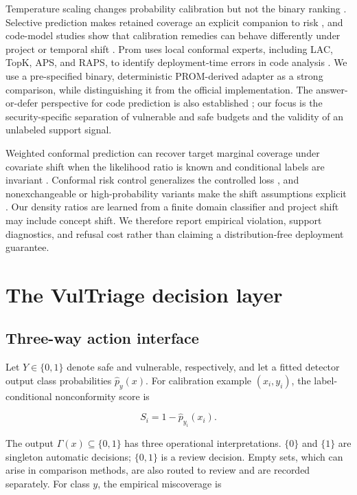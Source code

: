 \documentclass[preprint,12pt]{elsarticle}
\begin{document}
Temperature scaling changes probability calibration but not the binary ranking \cite{guo2017calibration}. Selective prediction makes retained coverage an explicit companion to risk \cite{geifman2019selectivenet}, and code-model studies show that calibration remedies can behave differently under project or temporal shift \cite{zhou2024calibration,li2021shift}. Prom uses local conformal experts, including LAC, TopK, APS, and RAPS, to identify deployment-time errors in code analysis \cite{wang2025prom}. We use a pre-specified binary, deterministic PROM-derived adapter as a strong comparison, while distinguishing it from the official implementation. The answer-or-defer perspective for code prediction is also established \cite{rathnasuriya2026defer}; our focus is the security-specific separation of vulnerable and safe budgets and the validity of an unlabeled support signal.

Weighted conformal prediction can recover target marginal coverage under covariate shift when the likelihood ratio is known and conditional labels are invariant \cite{tibshirani2019weightedcp}. Conformal risk control generalizes the controlled loss \cite{angelopoulos2024crc}, and nonexchangeable or high-probability variants make the shift assumptions explicit \cite{farinhas2024necrc,almeida2025hpcrc}. Our density ratios are learned from a finite domain classifier and project shift may include concept shift. We therefore report empirical violation, support diagnostics, and refusal cost rather than claiming a distribution-free deployment guarantee.

\section{The VulTriage decision layer}

\subsection{Three-way action interface}

Let $Y\in\{0,1\}$ denote safe and vulnerable, respectively, and let a fitted detector output class probabilities $\widehat p_y(x)$. For calibration example $(x_i,y_i)$, the label-conditional nonconformity score is

\begin{equation}
 S_i=1-\widehat p_{y_i}(x_i).
\end{equation}

The output $\Gamma(x)\subseteq\{0,1\}$ has three operational interpretations. $\{0\}$ and $\{1\}$ are singleton automatic decisions; $\{0,1\}$ is a review decision. Empty sets, which can arise in comparison methods, are also routed to review and are recorded separately. For class $y$, the empirical miscoverage is
\end{document}
